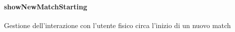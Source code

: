 \documentclass[letterpaper,10pt,italian,openany,oneside]{sphinxmanual}
\begin{document}
\paragraph{showNewMatchStarting}
\label{\detokenize{test/it/unicam/cs/pa/mastermind/ui/StartView:shownewmatchstarting}}

\begin{fulllineitems}
\label{\detokenize{test/it/unicam/cs/pa/mastermind/ui/StartView:it.unicam.cs.pa.mastermind.ui.StartView.showNewMatchStarting()}}
Gestione dell’interazione con l’utente fisico circa l’inizio di un nuovo match

\end{fulllineitems}




\renewcommand{\indexname}{Indice}
\printindex
\end{document}
